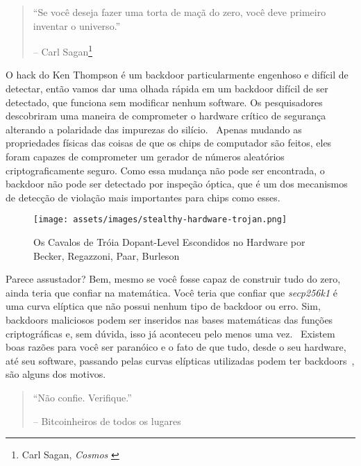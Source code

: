\begin{quotation}\begin{samepage}
\enquote{Se você deseja fazer uma torta de maçã do zero, você deve primeiro inventar o universo.}
\begin{flushright} -- Carl Sagan\footnote{Carl Sagan, \textit{Cosmos} \cite{cosmos}}
\end{flushright}\end{samepage}\end{quotation}

O hack do Ken Thompson é um backdoor particularmente engenhoso e difícil de detectar, então vamos dar uma olhada rápida em um backdoor difícil de ser detectado, que funciona sem modificar nenhum software. Os pesquisadores descobriram uma maneira de comprometer o hardware crítico de segurança alterando a polaridade das impurezas do silício.~\cite{becker2013stealthy} Apenas mudando as propriedades físicas das coisas de que os chips de computador são feitos, eles foram capazes de comprometer um gerador de números aleatórios criptograficamente seguro. Como essa mudança não pode ser encontrada, o backdoor não pode ser detectado por inspeção óptica, que é um dos mecanismos de detecção de violação mais importantes para chips como esses.

\begin{figure}
  \texttt{[image: assets/images/stealthy-hardware-trojan.png]}
  \caption{Os Cavalos de Tróia Dopant-Level Escondidos no Hardware por Becker, Regazzoni, Paar, Burleson}
  \label{fig:stealthy-hardware-trojan}
\end{figure}

Parece assustador? Bem, mesmo se você fosse capaz de construir tudo do zero, ainda teria que confiar na matemática. Você teria que confiar que \textit{secp256k1} é uma curva elíptica que não possui nenhum tipo de backdoor ou erro. Sim, backdoors maliciosos podem ser inseridos nas bases matemáticas das funções criptográficas e, sem dúvida, isso já aconteceu pelo menos uma vez.~\cite{wiki:Dual_EC_DRBG} Existem boas razões para você ser paranóico e o fato de que tudo, desde o seu hardware, até seu software, passando pelas curvas elípticas utilizadas podem ter backdoors~\cite{wiki:backdoors}, são alguns dos motivos.

\begin{quotation}\begin{samepage}
\enquote{Não confie. Verifique.}
\begin{flushright} -- Bitcoinheiros de todos os lugares
\end{flushright}\end{samepage}\end{quotation}

